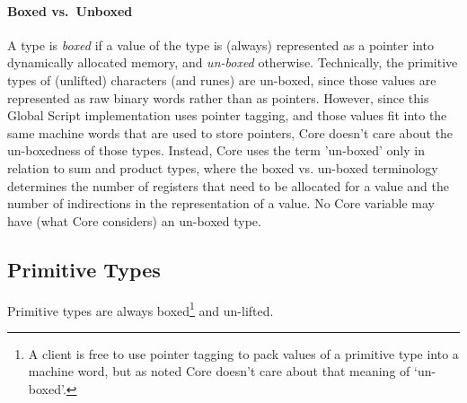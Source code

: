 \documentclass{article}
\newcommand\defn[1]{\emph{#1}}
\begin{document}
\paragraph{Boxed vs.~Unboxed}
A type is \defn{boxed} if a value of the type is (always) represented as a pointer into dynamically allocated memory,
and \defn{un-boxed} otherwise.
Technically, the primitive types of (unlifted) characters (and runes) are un-boxed,
since those values are represented as raw binary words rather than as pointers.
However, since this Global Script implementation uses pointer tagging,
and those values fit into the same machine words that are used to store pointers,
Core doesn't care about the un-boxedness of those types.
Instead, Core uses the term 'un-boxed' only in relation to sum and product types,
where the boxed vs. un-boxed terminology determines the number of registers that need to be allocated for a value and
the number of indirections in the representation of a value.
No Core variable may have (what Core considers) an un-boxed type.

\subsection{Primitive Types}

Primitive types are always boxed\footnote{
    A client is free to use pointer tagging to pack values of a primitive type into a machine word,
    but as noted Core doesn't care about that meaning of `un-boxed'.
} and un-lifted.
\end{document}
